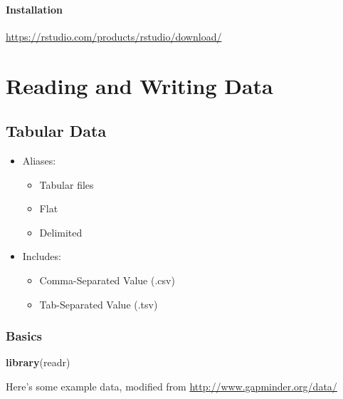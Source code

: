 \documentclass[
]{book}
\newenvironment{Shaded}{\begin{snugshade}}{\end{snugshade}}
\newcommand{\KeywordTok}[1]{\textcolor[rgb]{0.13,0.29,0.53}{\textbf{#1}}}
\newcommand{\NormalTok}[1]{#1}
\providecommand{\tightlist}{%
  \setlength{\itemsep}{0pt}\setlength{\parskip}{0pt}}
\begin{document}
\hypertarget{installation-1}{%
\subsection{Installation}\label{installation-1}}

\url{https://rstudio.com/products/rstudio/download/}

\cleardoublepage

\hypertarget{part-reading-and-writing-data}{%
\part{Reading and Writing Data}\label{part-reading-and-writing-data}}

\hypertarget{tabular-data}{%
\chapter{Tabular Data}\label{tabular-data}}

\begin{itemize}
\tightlist
\item
  Aliases:

  \begin{itemize}
  \tightlist
  \item
    Tabular files
  \item
    Flat
  \item
    Delimited
  \end{itemize}
\item
  Includes:

  \begin{itemize}
  \tightlist
  \item
    Comma-Separated Value (.csv)
  \item
    Tab-Separated Value (.tsv)
  \end{itemize}
\end{itemize}

\hypertarget{basics}{%
\section{Basics}\label{basics}}

\begin{Shaded}
\begin{Highlighting}[]
\KeywordTok{library}\NormalTok{(readr)}
\end{Highlighting}
\end{Shaded}

Here's some example data, modified from \url{http://www.gapminder.org/data/}
\end{document}

